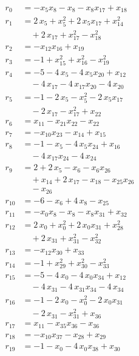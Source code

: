 \begin{align*}
r_{0} &= -x_{5} x_{8} - x_{8} - x_{8} x_{17} + x_{18} \\
r_{1} &= 2\,x_{5} + x_{5}^{2} + 2\,x_{5} x_{17} + x_{14}^{2} \\
&\quad{}+ 2\,x_{17} + x_{17}^{2} - x_{18}^{2} \\
r_{2} &= -x_{12} x_{16} + x_{19} \\
r_{3} &= -1 + x_{15}^{2} + x_{16}^{2} - x_{19}^{2} \\
r_{4} &= -5 - 4\,x_{5} - 4\,x_{5} x_{20} + x_{12} \\
&\quad{}- 4\,x_{17} - 4\,x_{17} x_{20} - 4\,x_{20} \\
r_{5} &= -1 - 2\,x_{5} - x_{5}^{2} - 2\,x_{5} x_{17} \\
&\quad{}- 2\,x_{17} - x_{17}^{2} + x_{22} \\
r_{6} &= x_{11} - x_{21} x_{22} - x_{22} \\
r_{7} &= -x_{10} x_{23} - x_{14} + x_{15} \\
r_{8} &= -1 - x_{5} - 4\,x_{5} x_{24} + x_{16} \\
&\quad{}- 4\,x_{17} x_{24} - 4\,x_{24} \\
r_{9} &= 2 + 2\,x_{5} - x_{6} - x_{6} x_{26} \\
&\quad{}+ x_{14} + 2\,x_{17} - x_{18} - x_{25} x_{26} \\
&\quad{}- x_{26} \\
r_{10} &= -6 - x_{6} + 4\,x_{8} - x_{25} \\
r_{11} &= -x_{0} x_{8} - x_{8} - x_{8} x_{31} + x_{32} \\
r_{12} &= 2\,x_{0} + x_{0}^{2} + 2\,x_{0} x_{31} + x_{28}^{2} \\
&\quad{}+ 2\,x_{31} + x_{31}^{2} - x_{32}^{2} \\
r_{13} &= -x_{12} x_{30} + x_{33} \\
r_{14} &= -1 + x_{29}^{2} + x_{30}^{2} - x_{33}^{2} \\
r_{15} &= -5 - 4\,x_{0} - 4\,x_{0} x_{34} + x_{12} \\
&\quad{}- 4\,x_{31} - 4\,x_{31} x_{34} - 4\,x_{34} \\
r_{16} &= -1 - 2\,x_{0} - x_{0}^{2} - 2\,x_{0} x_{31} \\
&\quad{}- 2\,x_{31} - x_{31}^{2} + x_{36} \\
r_{17} &= x_{11} - x_{35} x_{36} - x_{36} \\
r_{18} &= -x_{10} x_{37} - x_{28} + x_{29} \\
r_{19} &= -1 - x_{0} - 4\,x_{0} x_{38} + x_{30} \\

\end{align*}
